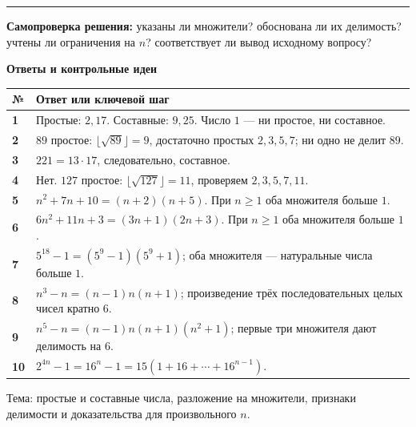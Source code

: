 \documentclass[a4paper,12pt]{article}
\begin{document}
\vspace{5mm}
\textcolor{accent}{\rule{\linewidth}{0.6pt}}
\small
\textbf{Самопроверка решения:} указаны ли множители? обоснована ли их делимость? учтены ли ограничения на \(n\)? соответствует ли вывод исходному вопросу?
\normalsize

\clearpage
\begin{center}
{\LARGE\color{darkaccent}\bfseries Ответы и контрольные идеи}\par
\end{center}
\vspace{7mm}
\renewcommand{\arraystretch}{1.45}
\begin{tabularx}{\linewidth}{@{}>{\bfseries}p{10mm}X@{}}
\toprule
№ & Ответ или ключевой шаг \\
\midrule
1 & Простые: \(2,17\). Составные: \(9,25\). Число \(1\) --- ни простое, ни составное. \\
2 & \(89\) простое: \(\lfloor\sqrt{89}\rfloor=9\), достаточно простых \(2,3,5,7\); ни одно не делит \(89\). \\
3 & \(221=13\cdot17\), следовательно, составное. \\
4 & Нет. \(127\) простое: \(\lfloor\sqrt{127}\rfloor=11\), проверяем \(2,3,5,7,11\). \\
5 & \(n^2+7n+10=(n+2)(n+5)\). При \(n\ge1\) оба множителя больше \(1\). \\
6 & \(6n^2+11n+3=(3n+1)(2n+3)\). При \(n\ge1\) оба множителя больше \(1\). \\
7 & \(5^{18}-1=(5^9-1)(5^9+1)\); оба множителя --- натуральные числа больше \(1\). \\
8 & \(n^3-n=(n-1)n(n+1)\); произведение трёх последовательных целых чисел кратно \(6\). \\
9 & \(n^5-n=(n-1)n(n+1)(n^2+1)\); первые три множителя дают делимость на \(6\). \\
10 & \(2^{4n}-1=16^n-1=15(1+16+\cdots+16^{n-1})\). \\
\bottomrule
\end{tabularx}
\vfill
{\footnotesize\color{lightgray}Тема: простые и составные числа, разложение на множители, признаки делимости и доказательства для произвольного \(n\).}
\end{document}
